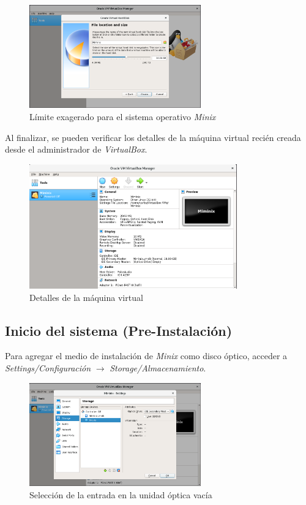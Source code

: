 \documentclass[12pt]{scrartcl}
\begin{document}
\begin{figure}[H]
  \centering
  \includegraphics[width=0.66\textwidth]{vb/6.png}
  \caption{Límite exagerado para el sistema operativo \textit{Minix}}
\end{figure}

Al finalizar, se pueden verificar los detalles de la máquina virtual recién creada desde el administrador de \textit{VirtualBox}.

\begin{figure}[H]
  \centering
  \includegraphics[width=0.8\textwidth]{vb/7.png}
  \caption{Detalles de la máquina virtual}
\end{figure}

\subsection{Inicio del sistema (Pre-Instalación)}
Para agregar el medio de instalación de \textit{Minix} como disco óptico, acceder a \textit{Settings/Configuración} $\rightarrow$  \textit{Storage/Almacenamiento}.

\begin{figure}[H]
  \centering
  \includegraphics[width=0.66\textwidth]{vb/8.png}
  \caption{Selección de la entrada en la unidad óptica vacía}
\end{figure}
\end{document}
